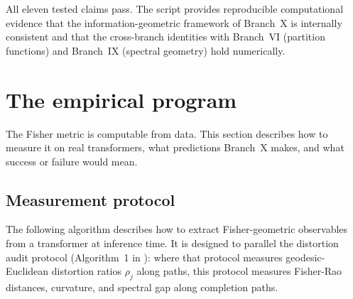 \documentclass[11pt]{article}
\theoremstyle{remark}
\begin{document}
All eleven tested claims pass.  The script provides reproducible
computational evidence that the information-geometric framework of
Branch~X is internally consistent and that the cross-branch identities
with Branch~VI (partition functions) and Branch~IX (spectral geometry)
hold numerically.

\section{The empirical program}
\label{sec:empirical}

The Fisher metric is computable from data.  This section describes how to
measure it on real transformers, what predictions Branch~X makes, and what
success or failure would mean.

\subsection{Measurement protocol}

The following algorithm describes how to extract Fisher-geometric observables
from a transformer at inference time.  It is designed to parallel the distortion
audit protocol (Algorithm~1 in \cite{davis2025manifold}): where that protocol
measures geodesic-Euclidean distortion ratios $\rho_j$ along paths, this
protocol measures Fisher-Rao distances, curvature, and spectral gap along
completion paths.
\end{document}
